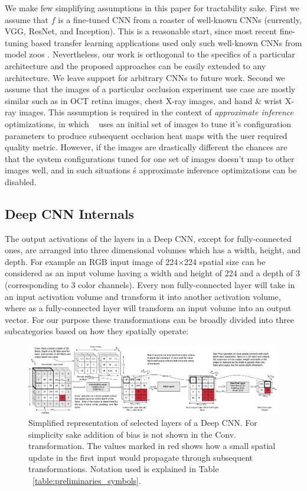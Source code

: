 We make few simplifying assumptions in this paper for tractability sake.
First we assume that $f$ is a fine-tuned CNN from a roaster of well-known CNNs (currently, VGG, ResNet, and Inception).
This is a reasonable start, since most recent fine-tuning based transfer learning applications used only such well-known CNNs from model zoos \cite{caffemodelzoo, tfmodelzoo}.
Nevertheless, our work is orthogonal to the specifics of a particular architecture and the proposed approaches can be easily extended to any architecture.
We leave support for arbitrary CNNs to future work.
Second we assume that the images of a particular occlusion experiment use case are mostly similar such as in OCT retina images, chest X-ray images, and hand \& wrist X-ray images.
This assumption is required in the context of \textit{approximate inference} optimizations, in which \system~ uses an initial set of images to tune it's configuration parameters to produce subsequent occlusion heat maps with the user required quality metric.
However, if the images are drastically different the chances are that the system configurations tuned for one set of images doesn't map to other images well, and in such situations \system\'s approximate inference optimizations can be disabled.

\subsection{Deep CNN Internals}
The output activations of the layers in a Deep CNN, except for fully-connected ones, are arranged into three dimensional volumes which has a width, height, and depth.
For example an RGB input image of 224$\times$224 spatial size can be considered as an input volume having a width and height of 224 and a depth of 3 (corresponding to 3 color channels). Every non fully-connected layer will take in an input activation volume and transform it into another activation volume, where as a fully-connected layer will transform an input volume into an output vector. For our purpose these transformations can be broadly divided into three subcategories based on how they spatially operate:

\begin{figure}[t]
\includegraphics[width=\textwidth]{images/cnn_simplified}
\caption{Simplified representation of selected layers of a Deep CNN. For simplicity sake addition of bias is not shown in the Conv. transformation. The values marked in red shows how a small spatial update in the first input would propagate through subsequent transformations. Notation used is explained in Table ~\ref{table:preliminaries_symbols}.}
\end{figure}

